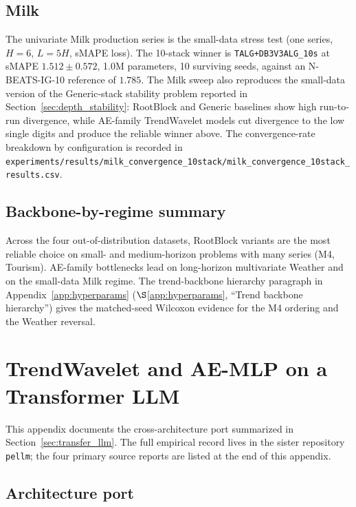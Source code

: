 \documentclass[11pt,a4paper]{article}
\begin{document}
\subsection{Milk}

\begin{sloppypar}
The univariate Milk production series is the small-data stress test (one series, $H=6$, $L=5H$, sMAPE loss). The 10-stack winner is \texttt{TALG+DB3V3ALG\_10s} at sMAPE $1.512 \pm 0.572$, 1.0M parameters, 10 surviving seeds, against an N-BEATS-IG-10 reference of $1.785$. The Milk sweep also reproduces the small-data version of the Generic-stack stability problem reported in Section~\ref{sec:depth_stability}: RootBlock and Generic baselines show high run-to-run divergence, while AE-family TrendWavelet models cut divergence to the low single digits and produce the reliable winner above. The convergence-rate breakdown by configuration is recorded in \nolinkurl{experiments/results/milk_convergence_10stack/milk_convergence_10stack_results.csv}.
\end{sloppypar}

\subsection{Backbone-by-regime summary}

Across the four out-of-distribution datasets, RootBlock variants are the most reliable choice on small- and medium-horizon problems with many series (M4, Tourism). AE-family bottlenecks lead on long-horizon multivariate Weather and on the small-data Milk regime. The trend-backbone hierarchy paragraph in Appendix~\ref{app:hyperparams} ($\S$\ref{app:hyperparams}, ``Trend backbone hierarchy'') gives the matched-seed Wilcoxon evidence for the M4 ordering and the Weather reversal.

\section{TrendWavelet and AE-MLP on a Transformer LLM}
\label{app:llm_transfer}

This appendix documents the cross-architecture port summarized in Section~\ref{sec:transfer_llm}. The full empirical record lives in the sister repository \texttt{pellm}; the four primary source reports are listed at the end of this appendix.

\subsection{Architecture port}
\end{document}
